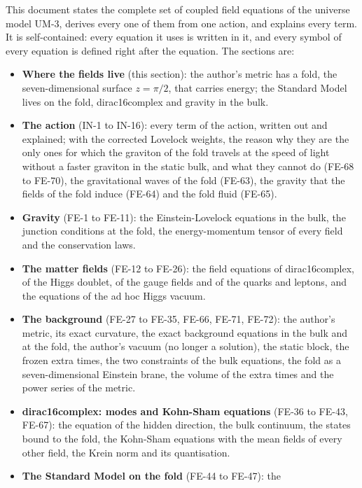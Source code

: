 \documentclass[
  10pt,
]{article}
\providecommand{\tightlist}{%
  \setlength{\itemsep}{0pt}\setlength{\parskip}{0pt}}
\begin{document}
This document states the complete set of coupled field equations of the
universe model UM-3, derives every one of them from one action, and
explains every term. It is self-contained: every equation it uses is
written in it, and every symbol of every equation is defined right after
the equation. The sections are:

\begin{itemize}
\tightlist
\item
  \textbf{Where the fields live} (this section): the author's metric has
  a fold, the seven-dimensional surface \(z = \pi/2\), that carries
  energy; the Standard Model lives on the fold, dirac16complex and
  gravity in the bulk.
\item
  \textbf{The action} (IN-1 to IN-16): every term of the action, written
  out and explained; with the corrected Lovelock weights, the reason why
  they are the only ones for which the graviton of the fold travels at
  the speed of light without a faster graviton in the static bulk, and
  what they cannot do (FE-68 to FE-70), the gravitational waves of the
  fold (FE-63), the gravity that the fields of the fold induce (FE-64)
  and the fold fluid (FE-65).
\item
  \textbf{Gravity} (FE-1 to FE-11): the Einstein-Lovelock equations in
  the bulk, the junction conditions at the fold, the energy-momentum
  tensor of every field and the conservation laws.
\item
  \textbf{The matter fields} (FE-12 to FE-26): the field equations of
  dirac16complex, of the Higgs doublet, of the gauge fields and of the
  quarks and leptons, and the equations of the ad hoc Higgs vacuum.
\item
  \textbf{The background} (FE-27 to FE-35, FE-66, FE-71, FE-72): the
  author's metric, its exact curvature, the exact background equations
  in the bulk and at the fold, the author's vacuum (no longer a
  solution), the static block, the frozen extra times, the two
  constraints of the bulk equations, the fold as a seven-dimensional
  Einstein brane, the volume of the extra times and the power series of
  the metric.
\item
  \textbf{dirac16complex: modes and Kohn-Sham equations} (FE-36 to
  FE-43, FE-67): the equation of the hidden direction, the bulk
  continuum, the states bound to the fold, the Kohn-Sham equations with
  the mean fields of every other field, the Krein norm and its
  quantisation.
\item
  \textbf{The Standard Model on the fold} (FE-44 to FE-47): the

\end{itemize}
\end{document}
